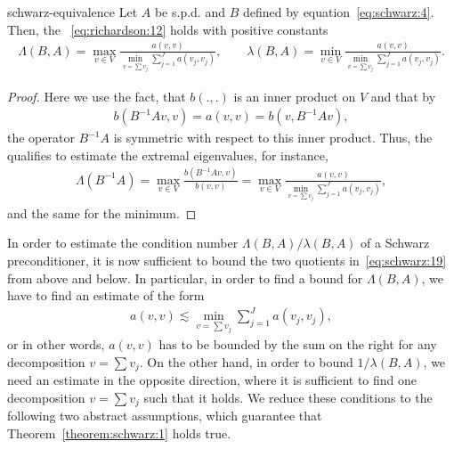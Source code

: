 \begin{Theorem}{schwarz-equivalence}
  \label{theorem:schwarz:1}
  Let $A$ be s.p.d. and $B$ defined by
  equation~\eqref{eq:schwarz:4}. Then, the ~\eqref{eq:richardson:12} holds with
  positive constants
  \begin{gather}
    \label{eq:schwarz:19}
    \Lambda(B,A) = \max_{v\in V} \frac{a(v,v)}{\min\limits_{v=\sum v_j}
      \sum\limits_{j=1}^J a(v_j, v_j)}
    ,\qquad
    \lambda(B,A) = \min\limits_{v\in V} \frac{a(v,v)}{\min\limits_{v=\sum v_j}
      \sum\limits_{j=1}^J a(v_j, v_j)}.
  \end{gather}
\end{Theorem}

\begin{proof}
  Here we use the fact, that $b(.,.)$ is an inner product on
  $V$ and that by
  \begin{gather*}
    b(B^{-1}A v,v) = a(v,v) = b(v, B^{-1}A v),
  \end{gather*}
  the operator $B^{-1}A$ is symmetric with respect to this inner
  product. Thus, the  qualifies to
  estimate the extremal eigenvalues, for instance,
  \begin{gather*}
    \Lambda(B^{-1}A)
    = \max_{v\in V} \frac{b(B^{-1}A v,v)}{b(v,v)}
    = \max_{v\in V} \frac{a(v,v)}{\min\limits_{v=\sum v_j}
      \sum\limits_{j=1}^J a(v_j, v_j)},
  \end{gather*}
  and the same for the minimum.
\end{proof}

\begin{remark}
  \label{note:schwarz:1}
  In order to estimate the condition number $\Lambda(B,A)/\lambda(B,A)$ of a Schwarz
  preconditioner, it is now sufficient to bound the two quotients
  in~\eqref{eq:schwarz:19} from above and below. In particular, in
  order to find a bound for $\Lambda(B,A)$, we have to find an estimate of
  the form
  \begin{gather}
    \label{eq:schwarz:23}
    a(v,v) \lesssim \min_{v=\sum v_j}\sum_{j=1}^J a(v_j, v_j),
  \end{gather}
  or in other words, $a(v,v)$ has to be bounded by the sum on the
  right for any decomposition $v=\sum v_j$. On the other hand, in
  order to bound $1/\lambda(B,A)$, we need an estimate in the opposite direction,
  where it is sufficient to find one decomposition $v=\sum v_j$ such
  that it holds. We reduce these
  conditions to the following two abstract assumptions, which guarantee that
  Theorem~\ref{theorem:schwarz:1} holds true.
\end{remark}

